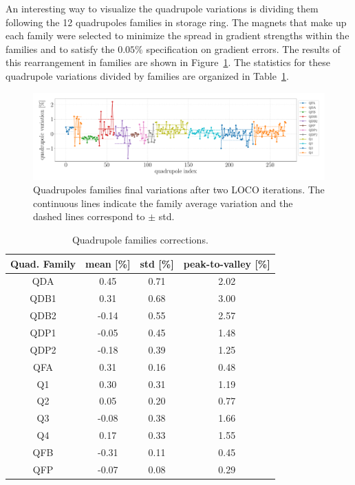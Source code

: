 An interesting way to visualize the quadrupole variations is dividing them following the 12 quadrupoles families in storage ring. The magnets that make up each family were selected to minimize the spread in gradient strengths within the families and to satisfy the $0.05\%$ specification on gradient errors. The results of this rearrangement in families are shown in Figure~\ref{fig:loco_corrections_final_families}. The statistics for these quadrupole variations divided by families are organized in Table~\ref{tab:quad_fam_corr}.
\begin{figure}
\centering
\includegraphics[width=1.0\textwidth]{figures/final_quads_correction_families_fix.pdf}
\caption{Quadrupoles families final variations after two LOCO iterations. The continuous lines indicate the family average variation and the dashed lines correspond to $\pm$ std.}
\label{fig:loco_corrections_final_families}
\end{figure}
\begin{table}
    \centering
    \caption{Quadrupole families corrections.}
    \label{tab:quad_fam_corr}
    \begin{tabular}{cccc}
        \toprule\toprule
        Quad. Family & mean [\%] & std [\%] & peak-to-valley [\%] \\
        \hline
        QDA  &  0.45  & 0.71 & 2.02 \\
        QDB1 &  0.31  & 0.68 & 3.00 \\
        QDB2 &  -0.14 &  0.55&  2.57 \\
        QDP1 &  -0.05 &  0.45 &  1.48 \\
        QDP2 &  -0.18 &  0.39 &  1.25 \\
        \hline
        QFA  &  0.31  & 0.16 & 0.48 \\
        Q1   &  0.30  & 0.31 & 1.19 \\
        Q2   &  0.05  & 0.20 & 0.77 \\
        Q3   &  -0.08 &  0.38 &  1.66 \\
        Q4   &  0.17  & 0.33 & 1.55 \\
        \hline
        QFB  &  -0.31 & 0.11 &  0.45 \\
        QFP  &  -0.07 &  0.08 &   0.29 \\
        \bottomrule\bottomrule
    \end{tabular}
\end{table}

